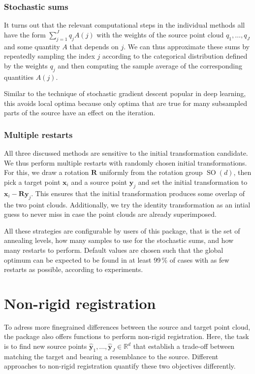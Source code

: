 \subsubsection{Stochastic sums}
It turns out that the relevant computational steps in the individual methods all
have the form $\sum_{j = 1}^J q_j A(j)$ with the weights of the source point
cloud $q_1, \dots, q_J$ and some quantity $A$ that depends on $j$.
We can thus approximate these sums by repeatedly sampling the index $j$
according to the categorical distribution defined by the weights $q_j$ and then
computing the sample average of the corresponding quantities $A(j)$.

Similar to the technique of stochastic gradient descent popular in deep
learning, this avoids local optima because only optima that are true for many
subsampled parts of the source have an effect on the iteration.

\subsubsection{Multiple restarts}
All three discussed methods are sensitive to the initial transformation
candidate.
We thus perform multiple restarts with randomly chosen initial transformations.
For this, we draw a rotation $\bm{R}$ uniformly from the rotation group
$\operatorname{SO}(d)$, then pick a target point $\bm{x}_i$ and a source point
$\bm{y}_j$ and set the initial transformation to $\bm{x}_i - \bm{R} \bm{y}_j$.
This ensures that the initial transformation produces some overlap of the
two point clouds.
Additionally, we try the identity transformation as an intial guess to never
miss in case the point clouds are already superimposed.

All these strategies are configurable by users of this package, that is the
set of annealing levels, how many samples to use for the stochastic sums, and
how many restarts to perform.
Default values are chosen such that the global optimum can be expected to be
found in at least 99\,\% of cases with as few restarts as possible, according
to experiments.


\section{Non-rigid registration}

To adress more finegrained differences between the source and target point
cloud, the package also offers functions to perform non-rigid registration.
Here, the task is to find new source points $\hat{\bm{y}}_1, ..., \hat{\bm{y}}_J
\in \mathbb{R}^d$ that establish a trade-off between matching the target and
bearing a resemblance to the source.
Different approaches to non-rigid registration quantify these two objectives
differently.

